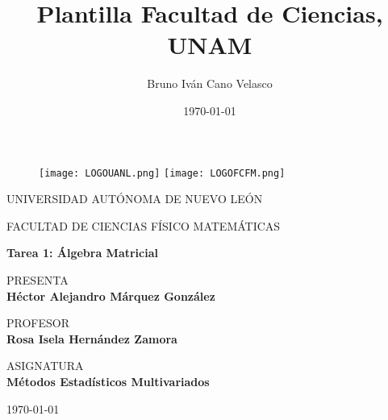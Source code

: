 \documentclass{article}
\title{Plantilla Facultad de Ciencias, UNAM}
\author{Bruno Iván Cano Velasco}
\date{\today}
\begin{document}
\thispagestyle{empty}
	
	\begin{figure}[ht]
			\texttt{[image: LOGOUANL.png]}
			\label{EscudoUNAM}
	   \endminipage
			\texttt{[image: LOGOFCFM.png]}
			\label{EscudoFC}
		\endminipage
	\end{figure}
	
	\begin{center}
	\vspace{0.8cm}
	\LARGE
	UNIVERSIDAD AUTÓNOMA DE NUEVO LEÓN
	
	\vspace{0.8cm}
	\LARGE
	FACULTAD DE CIENCIAS FÍSICO MATEMÁTICAS
	
	\vspace{1.7cm}	
	\Large
	\textbf{Tarea 1: Álgebra Matricial}

	\vspace{1.3cm}
	\normalsize	
	PRESENTA \\
	\vspace{.3cm}
	\large
	\textbf{Héctor Alejandro Márquez González}
	
	\vspace{1.3cm}
	\normalsize	
	PROFESOR \\
	\vspace{.3cm}
	\large
	\textbf{Rosa Isela Hernández Zamora}
	
	\vspace{1.3cm}
	\normalsize	
	ASIGNATURA \\
	\vspace{.3cm}
	\large
	\textbf{Métodos Estadísticos Multivariados}
	
	\vspace{1.3cm}
	\today
	\end{center}
	
	\newpage
	
\end{document}

